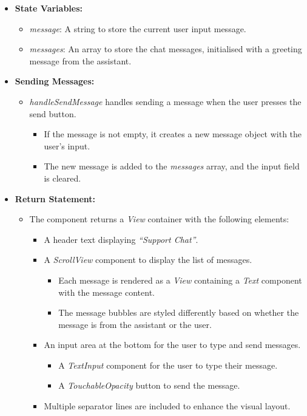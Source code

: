 \begin{itemize}
    \item \textbf{State Variables:}
    \begin{itemize}
        \item \textit{message}: A string to store the current user input message.
        \item \textit{messages}: An array to store the chat messages, initialised with a greeting message from the assistant.
    \end{itemize}

    \item \textbf{Sending Messages:}
    \begin{itemize}
        \item \textit{handleSendMessage} handles sending a message when the user presses the send button.
        \begin{itemize}
            \item If the message is not empty, it creates a new message object with the user's input.
            \item The new message is added to the \textit{messages} array, and the input field is cleared.
        \end{itemize}
    \end{itemize}

    \item \textbf{Return Statement:}
    \begin{itemize}
        \item The component returns a \textit{View} container with the following elements:
        \begin{itemize}
            \item A header text displaying \textit{``Support Chat''}.
            \item A \textit{ScrollView} component to display the list of messages.
            \begin{itemize}
                \item Each message is rendered as a \textit{View} containing a \textit{Text} component with the message content.
                \item The message bubbles are styled differently based on whether the message is from the assistant or the user.
            \end{itemize}
            \item An input area at the bottom for the user to type and send messages.
            \begin{itemize}
                \item A \textit{TextInput} component for the user to type their message.
                \item A \textit{TouchableOpacity} button to send the message.
            \end{itemize}
            \item Multiple separator lines are included to enhance the visual layout.
        \end{itemize}
    \end{itemize}
\end{itemize}

